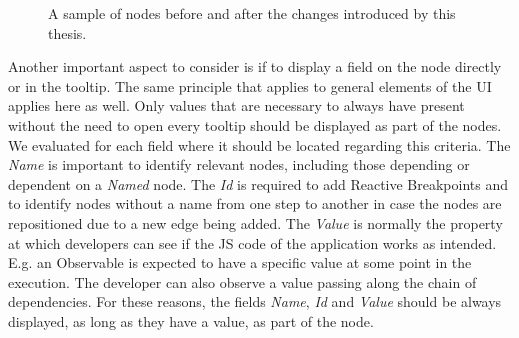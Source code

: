 \begin{figure}[!h]
	\centering
	\hfill
	\caption{A sample of nodes before and after the changes introduced by this thesis.}
	\label{fig:Nodes}
\end{figure}
Another important aspect to consider is if to display a field on the node directly or in the tooltip. The same principle that applies to general elements of the UI applies here as well. Only values that are necessary to always have present without the need to open every tooltip should be displayed as part of the nodes. We evaluated for each field where it should be located regarding this criteria. The \emph{Name} is important to identify relevant nodes, including those depending or dependent on a \emph{Named} node. The \emph{Id} is required to add Reactive Breakpoints and to identify nodes without a name from one step to another in case the nodes are repositioned due to a new edge being added. The \emph{Value} is normally the property at which developers can see if the JS code of the application works as intended. E.g. an Observable is expected to have a specific value at some point in the execution. The developer can also observe a value passing along the chain of dependencies. For these reasons, the fields \emph{Name}, \emph{Id} and \emph{Value} should be always displayed, as long as they have a value, as part of the node. %
